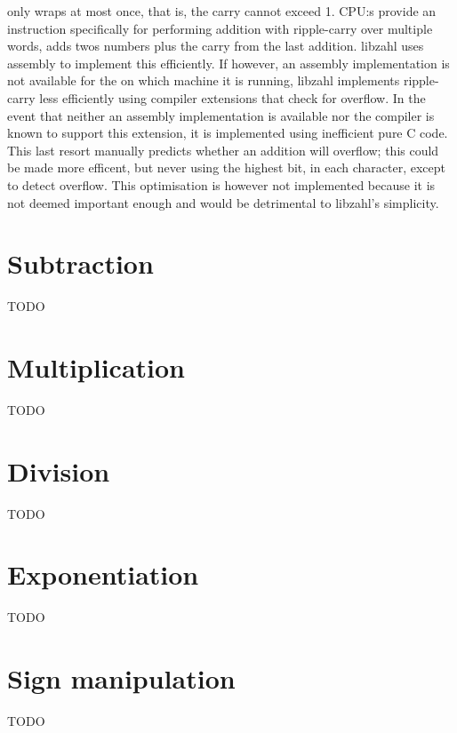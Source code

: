 \noindent
only wraps at most once, that is, the
carry cannot exceed 1. CPU:s provide an
instruction specifically for performing
addition with ripple-carry over multiple words,
adds twos numbers plus the carry from the
last addition. libzahl uses assembly to
implement this efficiently. If however, an
assembly implementation is not available for
the on which machine it is running, libzahl
implements ripple-carry less efficiently
using compiler extensions that check for
overflow. In the event that neither an
assembly implementation is available nor
the compiler is known to support this
extension, it is implemented using inefficient
pure C code. This last resort manually
predicts whether an addition will overflow;
this could be made more efficent, but never
using the highest bit, in each character,
except to detect overflow. This optimisation
is however not implemented because it is
not deemed important enough and would
be detrimental to libzahl's simplicity.


\newpage
\section{Subtraction}
\label{sec:Subtraction}

TODO %


\newpage
\section{Multiplication}
\label{sec:Multiplication}

TODO %


\newpage
\section{Division}
\label{sec:Division}

TODO %


\newpage
\section{Exponentiation}
\label{sec:Exponentiation}

TODO %


\newpage
\section{Sign manipulation}
\label{sec:Sign manipulation}

TODO %
